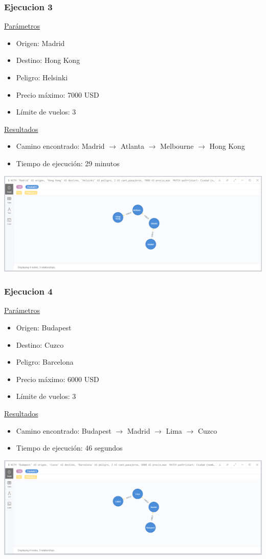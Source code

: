 \documentclass[a4paper,11pt]{article}
\begin{document}
\subsubsection*{Ejecucion 3}
\noindent
\underline{Parámetros}
\begin{itemize}
\item Origen: Madrid
\item Destino: Hong Kong
\item Peligro: Helsinki
\item Precio máximo: 7000 USD
\item Límite de vuelos: 3
\end{itemize}
\underline{Resultados}
\begin{itemize}
\item Camino encontrado: Madrid $\rightarrow$ Atlanta $\rightarrow$ Melbourne $\rightarrow$ Hong Kong
\item Tiempo de ejecución: 29 minutos
\end{itemize}
\begin{center}
\includegraphics[scale=0.40]{./imagenes/consultaB-ejec3.png}
\end{center}

\subsubsection*{Ejecucion 4}
\noindent
\underline{Parámetros}
\begin{itemize}
\item Origen: Budapest
\item Destino: Cuzco
\item Peligro: Barcelona
\item Precio máximo: 6000 USD
\item Límite de vuelos: 3
\end{itemize}
\underline{Resultados}
\begin{itemize}
\item Camino encontrado: Budapest $\rightarrow$ Madrid $\rightarrow$ Lima $\rightarrow$ Cuzco
\item Tiempo de ejecución: 46 segundos
\end{itemize}
\begin{center}
\includegraphics[scale=0.40]{./imagenes/consultaB-ejec4.png}
\end{center}
\end{document}
